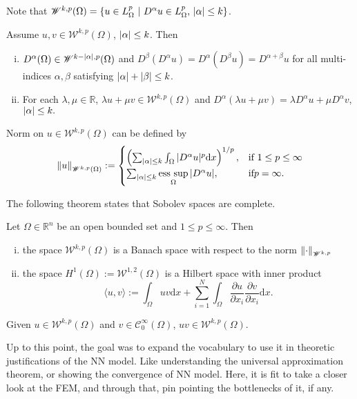 \begin{remark}
	Note that $\mathscr{W}^{k,p}(\Omega) = \{ u\in L^{p}_{\Omega} \text{ | } D^\alpha u \in L^{p}_{\Omega}\text{, } \vert\alpha\vert \leq k\}$.
\end{remark}
\begin{thm}
	Assume $u, v \in \mathscr{W}^{k,p}(\Omega)$,
$\vert\alpha\vert \leq k$. Then
	\begin{enumerate}[i.]
		\item $D^{\alpha}(\Omega) \in \mathscr{W}^{k-\vert\alpha\vert,p}(\Omega)$ and $D^{\beta}(D^{\alpha}u) = D^\alpha(D^\beta u) = D^{\alpha+\beta}u$ for all multi-indices $\alpha, \beta$ satisfying $\vert\alpha\vert + \vert\beta\vert\leq k$.
		\item  For each $\lambda, \mu \in \mathbb{R}$, $\lambda u + \mu v \in \mathscr{W}^{k,p}(\Omega)$ and $D^\alpha(\lambda u + \mu v) = \lambda D^\alpha u + \mu D^\alpha v$,
$\vert\alpha\vert \leq k.$
	\end{enumerate}
\end{thm}
\begin{defn}
	Norm on $u \in  \mathscr{W}^{k,p}(\Omega)$ can be defined by
	\begin{equation*}
		\left\lVert u\right\rVert_{\mathscr{W}^{k,p}(\Omega)} := 
		\begin{cases}
			\left( \sum_{\vert\alpha\vert\leq k} \int_{\Omega} \vert D^\alpha u\vert^p \text{d}x \right)^{1/p},& \text{if } 1 \leq p \leq \infty\\
			\sum_{\vert\alpha\vert\leq k} \mathop{\mathrm{ess~sup}}\limits_{\Omega}\vert D^\alpha u\vert,& \text{if} p = \infty.
		\end{cases}
	\end{equation*}
\end{defn}
The following theorem states that Sobolev spaces are complete.
\begin{thm}
	Let $\Omega \in \mathbb{R}^n$ be an open bounded set
and $1 \leq p \leq \infty$. Then
	\begin{enumerate}[i.]
		\item the space $\mathscr{W}^{k,p}(\Omega)$ is a Banach space with respect to the norm $\left\lVert\cdot\right\rVert_{\mathscr{W}^{k,p}}$
		\item the space $H^1(\Omega) := \mathscr{W}^{1,2}(\Omega)$ is a Hilbert space with inner product
		\begin{equation*}
			\langle u,v \rangle := \int_{\Omega} uv \text{d}x + \sum_{i=1}^{N}\int_{\Omega} \frac{\partial u}{\partial x_i} \frac{\partial v}{\partial x_i} \text{d}x.
		\end{equation*}
	\end{enumerate}
\end{thm}
\begin{lemma}
	Given $u \in \mathscr{W}^{k,p}(\Omega)$ and $v \in \mathscr{C}_{0}^{\infty} (\Omega)$, $uv \in \mathscr{W}^{k,p}(\Omega)$.
\end{lemma}
Up to this point, the goal was to expand the vocabulary to use it in theoretic justifications of the NN model. Like understanding the universal approximation theorem, or showing the convergence of NN model. Here, it is fit to take a closer look at the FEM, and through that, pin pointing the bottlenecks of it, if any. 
